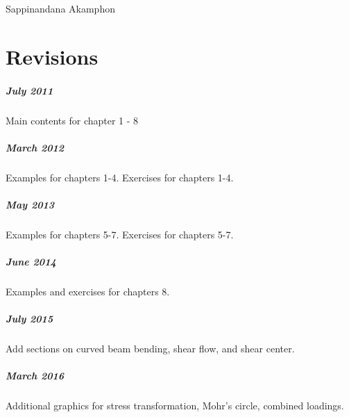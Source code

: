 \documentclass[
10pt,
a4paper,
openany,
svgnames,
]{book} %
\begin{document}
\vspace{3cm} \hspace{9cm}
Sappinandana Akamphon

\chapter*{Revisions}

\paragraph{July 2011}

Main contents for chapter 1 - 8

\paragraph{March 2012}

Examples for chapters 1-4. Exercises for chapters 1-4.

\paragraph{May 2013}

Examples for chapters 5-7. Exercises for chapters 5-7.

\paragraph{June 2014}

Examples and exercises for chapters 8.

\paragraph{July 2015}

Add sections on curved beam bending, shear flow, and shear center.

\paragraph{March 2016}

Additional graphics for stress transformation, Mohr's circle, combined loadings.

\tableofcontents

\listoffigures

\listoftables

\mainmatter

\end{document}
